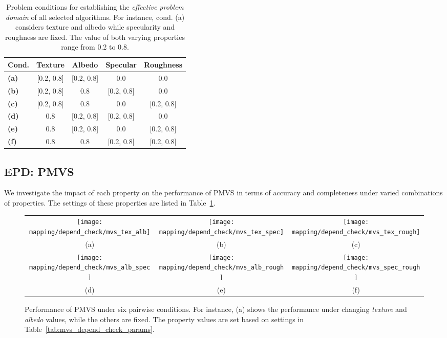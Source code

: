 \begin{table}[!htbp]
  \centering
  \begin{tabular}{l*{4}{c}}
  \hline
  \textbf{Cond.} & Texture & Albedo & Specular & Roughness\\
  \hline
  \textbf{(a)} & [0.2, 0.8] & [0.2, 0.8] & 0.0 & 0.0\\
  \textbf{(b)} & [0.2, 0.8] & 0.8 & [0.2, 0.8] & 0.0\\
  \textbf{(c)} & [0.2, 0.8] & 0.8 & 0.0 & [0.2, 0.8]\\
  \textbf{(d)} & 0.8 & [0.2, 0.8] & [0.2, 0.8] & 0.0\\
  \textbf{(e)} & 0.8 & [0.2, 0.8] & 0.0 & [0.2, 0.8]\\
  \textbf{(f)} & 0.8 & 0.8 & [0.2, 0.8] & [0.2, 0.8]\\
  \hline
  \end{tabular}
  \caption{Problem conditions for establishing the \textit{effective problem domain} of all selected algorithms. For instance, cond. (a) considers texture and albedo while specularity and roughness are fixed. The value of both varying properties range from 0.2 to 0.8.}
  \label{tab:pairwise_prob_cond}
\end{table}

\subsection{EPD: PMVS}
\label{sec:mvs_epd}
We investigate the impact of each property on the performance of PMVS in terms of accuracy and completeness under varied combinations of properties. The settings of these properties are listed in Table~\ref{tab:pairwise_prob_cond}.

\begin{figure}
\begin{tabular}{ccc}
\texttt{[image: mapping/depend\_check/mvs\_tex\_alb]}&
\texttt{[image: mapping/depend\_check/mvs\_tex\_spec]}&
\texttt{[image: mapping/depend\_check/mvs\_tex\_rough]}\\
(a) & (b) & (c)\\
\texttt{[image: mapping/depend\_check/mvs\_alb\_spec]}&
\texttt{[image: mapping/depend\_check/mvs\_alb\_rough]}&
\texttt{[image: mapping/depend\_check/mvs\_spec\_rough]}\\
(d) & (e) & (f)\\
\end{tabular}
\caption{Performance of PMVS under six pairwise conditions. For instance, (a) shows the performance under changing \textit{texture} and \textit{albedo} values, while the others are fixed. The property values are set based on settings in Table~\ref{tab:mvs_depend_check_params}.}
\label{fig:mvs_depend_check}
\end{figure}

